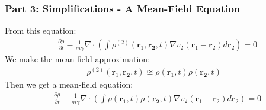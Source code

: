 \documentclass[aspectratio=169,xcolor=dvipsnames]{beamer}
\begin{document}
\begin{frame}
	\frametitle{Part 3: Simplifications - A Mean-Field Equation}
	From this equation:
	\begin{align*}
	&\frac{\partial \rho}{\partial t} -\frac{1}{m \gamma}  \nabla \cdot {\left(\int \rho^{(2)}(\mathbf{r}_1, \mathbf{r_2},t) \nabla v_2(\mathbf{r}_1 - \mathbf{r}_2) d\mathbf{r}_2\right)} = 0  
	\end{align*}
	We make the mean field approximation:
	\begin{align*}
	 \rho^{(2)}(\mathbf{r}_1, \mathbf{r_2},t) \approxeq  \rho(\mathbf{r}_1,t) \rho(\mathbf{r_2},t)
	\end{align*}
	Then we get a mean-field equation:
	\begin{align*}
	&\frac{\partial \rho}{\partial t} -\frac{1}{m \gamma}  \nabla \cdot {\left(\int \rho(\mathbf{r}_1,t) \rho(\mathbf{r_2},t)\nabla v_2(\mathbf{r}_1 - \mathbf{r}_2) d\mathbf{r}_2\right)} = 0  
	\end{align*}
\end{frame}
\end{document}
